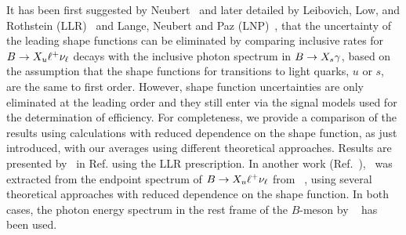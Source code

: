 It has been first suggested by Neubert~\cite{Neubert:1993um} and later detailed by Leibovich, 
Low, and Rothstein (LLR)~\cite{Leibovich:1999xf} and Lange, Neubert and Paz (LNP)~\cite{Lange:2005qn}, 
that the uncertainty of
the leading shape functions can be eliminated by comparing inclusive rates for
$B\to X_u\ell^+\nu_\ell$ decays with the inclusive photon spectrum in $B\to X_s\gamma$,
based on the assumption that the shape functions for transitions to light
quarks, $u$ or $s$, are the same to first order.
However, shape function uncertainties are only eliminated at the leading order
and they still enter via the signal models used for the determination of efficiency. 
For completeness, we provide a comparison of the results using 
calculations with reduced dependence on the shape function, as just
introduced, with our averages using different theoretical approaches.
Results are presented by \babar\ in Ref.\cite{Aubert:2006qi} using the LLR prescription. 
In another work (Ref.~\cite{Golubev:2007cs}), \vub\ was extracted from the 
endpoint spectrum of $B\to X_u\ell^+\nu_\ell$ from \babar~\cite{ref:babar-endpoint}, 
using several theoretical approaches with reduced dependence on the shape function.
In both cases, the photon energy spectrum in the 
rest frame of the $B$-meson by \babar~\cite{Aubert:2005cua} has been used.





